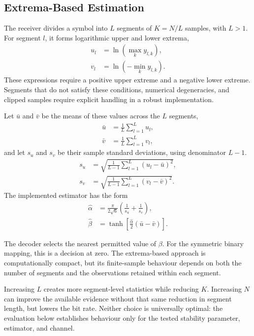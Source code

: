 \documentclass[conference]{IEEEtran}
\begin{document}
\subsection{Extrema-Based Estimation}
The receiver divides a symbol into $L$ segments of $K=N/L$ samples, with $L>1$. For segment $l$, it forms logarithmic upper and lower extrema,
\begin{align}
u_l&=\ln\left(\max_k y_{l,k}\right),\\
v_l&=\ln\left(-\min_k y_{l,k}\right).
\end{align}
These expressions require a positive upper extreme and a negative lower extreme. Segments that do not satisfy these conditions, numerical degeneracies, and clipped samples require explicit handling in a robust implementation.

Let $\bar u$ and $\bar v$ be the means of these values across the $L$ segments,
\begin{align}
\bar u &= \frac{1}{L}\sum_{l=1}^{L} u_l,\\
\bar v &= \frac{1}{L}\sum_{l=1}^{L} v_l,
\end{align}
and let $s_u$ and $s_v$ be their sample standard deviations, using denominator $L-1$. 
\begin{align}
s_u &= \sqrt{\frac{1}{L-1}
       \sum_{l=1}^{L}(u_l-\bar u)^2},\\
s_v &= \sqrt{\frac{1}{L-1}
       \sum_{l=1}^{L}(v_l-\bar v)^2}.
\end{align}
The implemented estimator has the form
\begin{align}
\hat\alpha&=\frac{\pi}{2\sqrt6}\left(\frac1{s_u}+\frac1{s_v}\right),\\
\hat\beta&=\tanh\left[\frac{\hat\alpha}{2}(\bar u-\bar v)\right].
\end{align}






The decoder selects the nearest permitted value of $\beta$. For the symmetric binary mapping, this is a decision at zero. The extrema-based approach is computationally compact, but its finite-sample behaviour depends on both the number of segments and the observations retained within each segment.

Increasing $L$ creates more segment-level statistics while reducing $K$. Increasing $N$ can improve the available evidence without that same reduction in segment length, but lowers the bit rate. Neither choice is universally optimal: the evaluation below establishes behaviour only for the tested stability parameter, estimator, and channel.
\end{document}
